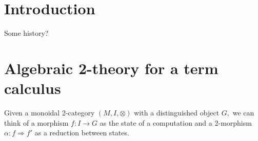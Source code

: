 \documentclass[]{acm_proc_article-sp}
\numberwithin{equation}{subsection}
\begin{document}
\begin{comment}
              * e.g. ({S, K} {a, b, c}) ↦ {(S a), (S b), (S c), (K a), (K b), (K c)}

  * Add modal operators to formulae

      * K is collection of 2-hole contexts using same collection monad

          * A <K> B = { t | ∃u ∈ [| A |], v ∈ [| B |], ρ: K(t, u) -> v}

              * e.g. in SKI or lambda, 
                A => B = { t | ∃u ∈ [| A |], v ∈ [| B |], ρ: (t u) -> v} = A <( )> B

                  * Need to think about reduction contexts here: are all t of the form Rt'?  I guess we can express sets of terms that do not involve R.

              * e.g. in pi calc
                A ▷ B = { t | ∃u ∈ [| A |], v ∈ [| B |], ρ: t | u -> v} = A <|> B

                  * Ditto for COMM

          * Stuff from LICS paper above

  * Examples of interesting formulae

      * primes in a monoid

      * deadlock-free (both kinds)

      * datalock-free? http://erights.org/elang/concurrency/epimenides.html

      * deniability from paper with Drossopolou

      * more?  
\end{comment}

\section{Introduction}

Some history?

\section{Algebraic 2-theory for a term calculus}

Given a monoidal 2-category $(M, I, \otimes)$ with a distinguished object $G,$ we can think of a morphism $f\colon I \to G$ as the state of a computation and a 2-morphism $\alpha\colon f \Rightarrow f'$ as a reduction between states.
\end{document}
